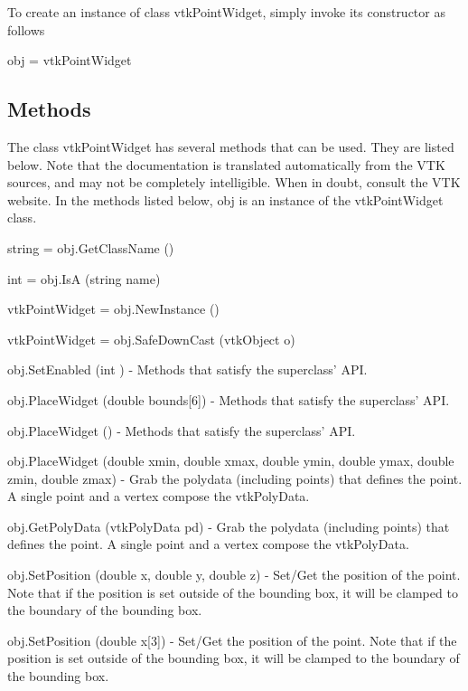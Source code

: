 To create an instance of class vtk\-Point\-Widget, simply invoke its constructor as follows \begin{DoxyVerb}  obj = vtkPointWidget
\end{DoxyVerb}
 \hypertarget{vtkwidgets_vtkxyplotwidget_Methods}{}\subsection{Methods}\label{vtkwidgets_vtkxyplotwidget_Methods}
The class vtk\-Point\-Widget has several methods that can be used. They are listed below. Note that the documentation is translated automatically from the V\-T\-K sources, and may not be completely intelligible. When in doubt, consult the V\-T\-K website. In the methods listed below, {\ttfamily obj} is an instance of the vtk\-Point\-Widget class. 
\begin{DoxyItemize}
\item {\ttfamily string = obj.\-Get\-Class\-Name ()}  
\item {\ttfamily int = obj.\-Is\-A (string name)}  
\item {\ttfamily vtk\-Point\-Widget = obj.\-New\-Instance ()}  
\item {\ttfamily vtk\-Point\-Widget = obj.\-Safe\-Down\-Cast (vtk\-Object o)}  
\item {\ttfamily obj.\-Set\-Enabled (int )} -\/ Methods that satisfy the superclass' A\-P\-I.  
\item {\ttfamily obj.\-Place\-Widget (double bounds\mbox{[}6\mbox{]})} -\/ Methods that satisfy the superclass' A\-P\-I.  
\item {\ttfamily obj.\-Place\-Widget ()} -\/ Methods that satisfy the superclass' A\-P\-I.  
\item {\ttfamily obj.\-Place\-Widget (double xmin, double xmax, double ymin, double ymax, double zmin, double zmax)} -\/ Grab the polydata (including points) that defines the point. A single point and a vertex compose the vtk\-Poly\-Data.  
\item {\ttfamily obj.\-Get\-Poly\-Data (vtk\-Poly\-Data pd)} -\/ Grab the polydata (including points) that defines the point. A single point and a vertex compose the vtk\-Poly\-Data.  
\item {\ttfamily obj.\-Set\-Position (double x, double y, double z)} -\/ Set/\-Get the position of the point. Note that if the position is set outside of the bounding box, it will be clamped to the boundary of the bounding box.  
\item {\ttfamily obj.\-Set\-Position (double x\mbox{[}3\mbox{]})} -\/ Set/\-Get the position of the point. Note that if the position is set outside of the bounding box, it will be clamped to the boundary of the bounding box.  

\end{DoxyItemize}
